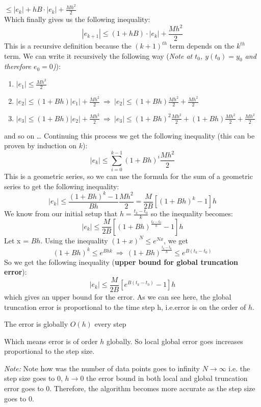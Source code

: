 \documentclass[11pt,a4paper]{amsart}
\begin{document}
\hspace{132px} $\displaystyle \leq |e_k| + hB\cdot|e_k| + \frac{Mh^2}{2}$\\
Which finally gives us the following inequality:
$$|e_{k+1}| \leq  (1+hB)\cdot|e_k| + \frac{Mh^2}{2}$$
This is a recursive definition because the $(k+1)^{th}$ term depends on the $k^{th}$ term.
We can write it recursively the following way (\emph{Note at $t_0$, $y(t_0) = y_0$ and therefore $e_0 = 0$)}):
\begin{enumerate}
	\item $\displaystyle |e_{1}| \leq  \frac{Mh^2}{2}$
	\item $\displaystyle |e_{2}| \leq (1+Bh)|e_1| + \frac{Mh^2}{2} 			\ \Rightarrow \ |e_{2}| \leq (1+Bh)\frac{Mh^2}{2} + \frac{Mh^2}{2}$
	\vspace{5px}
	\item $\displaystyle |e_{3}| \leq (1+Bh)|e_2| +\frac{Mh^2}{2} \ \Rightarrow \ |e_{3}| \leq (1+Bh)^2\frac{Mh^2}{2} + (1+Bh)\frac{Mh^2}{2}+ \frac{Mh^2}{2}$
\end{enumerate}
and so on \ldots
Continuing this process we get the following inequality (this can be proven by induction on $k$):
$$|e_{k}| \leq \sum_{i=0}^{k-1}(1+Bh)^i\frac{Mh^2}{2}$$
This is a geometric series, so we can use the formula for the sum of a geometric series to get the following inequality:
$$|e_{k}| \leq \frac{(1+Bh)^k - 1}{Bh}\frac{Mh^2}{2} = \frac{M}{2B}[(1 + Bh)^k - 1]h$$
We know from our initial setup that $\displaystyle h = \frac{t_k-t_0}{k}$ so the inequality becomes:
$$|e_{k}| \leq \frac{M}{2B}[(1 + Bh)^{\frac{t_k - t_0}{h}} - 1]h$$
Let x = $Bh$. Using the inequality $\displaystyle (1 + x)^N \leq e^{Nx}$,  \cite{burden} we get
$$(1 + Bh)^{k} \leq e^{Bhk} \ \Rightarrow \ (1 + Bh)^{\frac{t_k - t_0}{h}} \leq e^{B(t_k - t_0)}$$
So we get the following inequality ({\bf upper bound for global truncation error}):
$$|e_{k}| \leq \frac{M}{2B}[e^{B(t_k - t_0)} - 1]h$$
which gives an upper bound for the error.
As we can see here, the global truncation error is proportional to the time step h, i.e.error is on the order of $h$.
\begin{tcolorbox}
	The error is globally $O(h)$ every step
\end{tcolorbox}
Which means error is of order $h$ globally. So local global error goes increases proportional to the step size.

\vspace{5px}
{\em Note:} Note how was the number of data points goes to infinity $N \rightarrow \infty$ i.e. the  step size goes to 0, $h \rightarrow 0$ the error bound in both local and global truncation error goes to 0. Therefore, the algorithm becomes more accurate as the step size goes to 0.
\end{document}
